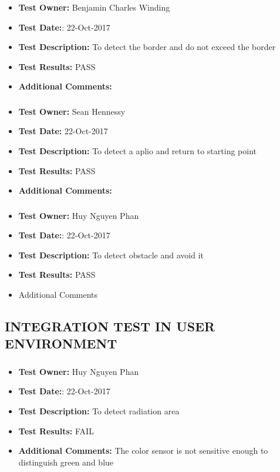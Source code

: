 \documentclass[10pt,a4paper,titlepage]{article}
\begin{document}
\subsubsection*{}
\begin{itemize}
\item \textbf{Test Owner:} Benjamin Charles Winding
\item \textbf{Test Date:}: 22-Oct-2017
\item \textbf{Test Description:} To detect the border and do not exceed the border
\item \textbf{Test Results:} PASS
\item \textbf{Additional Comments:}
\end{itemize}		
	
\subsubsection*{}
\begin{itemize}
\item \textbf{Test Owner:} Sean Hennessy
\item \textbf{Test Date:} 22-Oct-2017
\item \textbf{Test Description:} To detect a aplio and return to starting point
\item \textbf{Test Results:} PASS 
\item \textbf{Additional Comments:} 
\end{itemize}

\subsubsection*{}
\begin{itemize}
\item \textbf{Test Owner:}  Huy Nguyen Phan
\item \textbf{Test Date:}: 22-Oct-2017
\item \textbf{Test Description:} To detect obstacle and avoid it 
\item \textbf{Test Results:} PASS
\item Additional Comments	
\end{itemize}

\subsection{INTEGRATION TEST IN USER ENVIRONMENT}
\subsubsection*{}
\begin{itemize}
	\item \textbf{Test Owner:}  Huy Nguyen Phan
	\item \textbf{Test Date:}: 22-Oct-2017
	\item \textbf{Test Description:} To detect radiation area 
	\item \textbf{Test Results:} FAIL
	\item \textbf{Additional Comments:} The color sensor is not sensitive enough to distinguish green and blue
	
\end{itemize}
\end{document}
